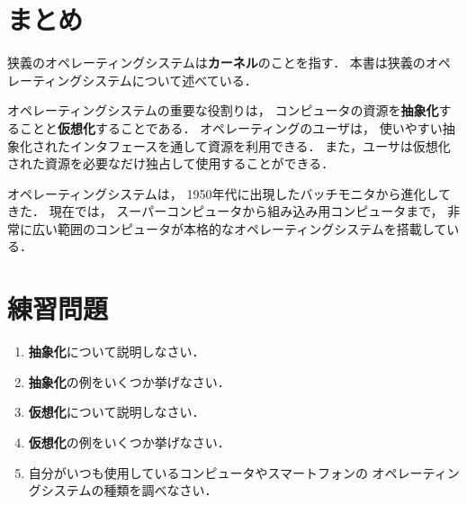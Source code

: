 \section{まとめ}
狭義のオペレーティングシステムは{\bf カーネル}のことを指す．
本書は狭義のオペレーティングシステムについて述べている．

オペレーティングシステムの重要な役割りは，
コンピュータの資源を{\bf 抽象化}することと{\bf 仮想化}することである．
オペレーティングのユーザは，
使いやすい抽象化されたインタフェースを通して資源を利用できる．
また，ユーサは仮想化された資源を必要なだけ独占して使用することができる．

オペレーティングシステムは，
1950年代に出現したバッチモニタから進化してきた．
現在では，
スーパーコンピュータから組み込み用コンピュータまで，
非常に広い範囲のコンピュータが本格的なオペレーティングシステムを搭載している．


\section*{練習問題}
\begin{enumerate}
\renewcommand{\labelenumi}{\tt \arabic{chapter}.\arabic{enumi}}
 \setlength{\leftskip}{1em}

\item {\bf 抽象化}について説明しなさい．

\item {\bf 抽象化}の例をいくつか挙げなさい．

\item {\bf 仮想化}について説明しなさい．

\item {\bf 仮想化}の例をいくつか挙げなさい．

\item 自分がいつも使用しているコンピュータやスマートフォンの
オペレーティングシステムの種類を調べなさい．

\end{enumerate}

